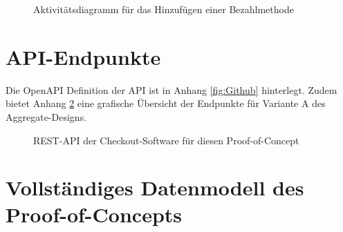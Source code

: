 \begin{anhang}
\begin{figure}[h!]
	\centering
	
	\caption{Aktivitätsdiagramm für das Hinzufügen einer Bezahlmethode}
	\label{fig:SL-PutBezahlmethode}
	\vspace{500pt}
\end{figure}

\newpage

\section{API-Endpunkte}

Die OpenAPI Definition der API ist in Anhang \ref{fig:Github} hinterlegt. Zudem bietet Anhang \ref{fig:REST-API} eine grafische Übersicht der Endpunkte für Variante A des Aggregate-Designs.

\begin{figure}[h!]
	\centering
	
	\caption{REST-API der Checkout-Software für diesen Proof-of-Concept}
	\label{fig:REST-API}
\end{figure}

\newpage
\section{Vollständiges Datenmodell des Proof-of-Concepts} \label{label:Daten-Modell}


\end{anhang}
